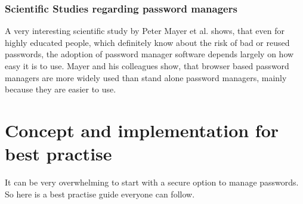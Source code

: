 \documentclass[conference]{IEEEtran}
\begin{document}
\subsubsection{Scientific Studies regarding password managers}
A very interesting scientific study by Peter Mayer et al. shows, that even for highly educated people, which definitely know about the risk of bad or reused passwords, the adoption of password manager software depends largely on how easy it is to use. Mayer and his colleagues show, that browser based password managers are more widely used than stand alone password managers, mainly because they are easier to use.\cite{b13}

\section{Concept and implementation for best practise}
It can be very overwhelming to start with a secure option to manage passwords. So here is a best practise guide everyone can follow.
\end{document}
